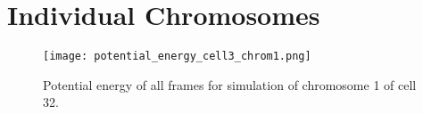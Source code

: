 
\chapter{Individual Chromosomes} %
\label{cha:individual_chromosomes}



\begin{figure}[ht]
\centering
	\texttt{[image: potential\_energy\_cell3\_chrom1.png]}
	\caption{Potential energy of all frames for simulation of chromosome 1 of cell 32.}
	\label{img:potential_energy_cell3_chrom1}
\end{figure}

